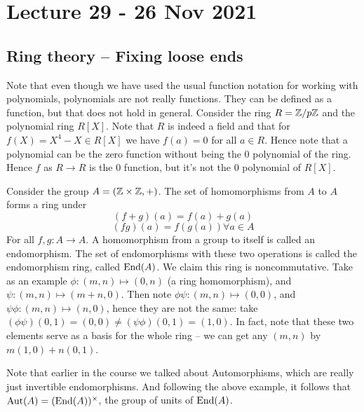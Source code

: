 \section{Lecture 29 - 26 Nov 2021}
\subsection{Ring theory -- Fixing loose ends}
Note that even though we have used the usual function notation for working with
polynomials, polynomials are not really functions. They can be defined as a function, but
that does not hold in general. Consider the ring $R=\mathbb Z/p\mathbb Z$ and  the polynomial ring
$R[X]$. Note that $R$ is indeed a field and that for $f(X)=X^4-X\in R[X]$ we have $f(a)=0$
for all $a\in R$. Hence note that a polynomial can be the zero function without being the
$0$ polynomial of the ring. Hence $f$ as $R\to R$ is the $0$ function, but it's not the
$0$ polynomial of $R[X]$.

\begin{example}
  Consider the group $A=(\mathbb Z\times\mathbb Z, +)$. The set of
  homomorphisms from $A$ to $A$ forms a ring under 
  \[(f+g)(a)= f(a)+g(a)\]
  \[(fg)(a) = f(g(a)) \forall a\in A\]
  For all $f,g:A\to A$. A homomorphism from a group to itself is called an
  endomorphism. The set of endomorphisms with these two operations is called the
  endomorphism ring, called $\operatorname{End}(A)$. We claim this ring is noncommutative. Take as
  an example $\phi:(m,n)\mapsto (0,n)$ (a ring homomorphism), and $\psi:(m,n)\mapsto
  (m+n,0)$. Then note $\phi\psi:(m,n)\mapsto (0,0)$, and $\psi\phi:(m,n)\mapsto (n,0)$,
  hence they are not the same: take $(\phi\psi)(0,1)=(0,0)\neq
  (\psi\phi)(0,1)=(1,0)$. In fact, note that these two elements serve as a basis for the
  whole ring -- we can get any $(m,n)$ by $m(1,0)+n(0,1)$.
\end{example}

Note that earlier in the course we talked about Automorphisms, which are really just
invertible endomorphisms. And following the above example, it follows that
$\operatorname{Aut}(A)=(\operatorname{End}(A))^{\times}$, the group of units of $\operatorname{End}(A)$.
